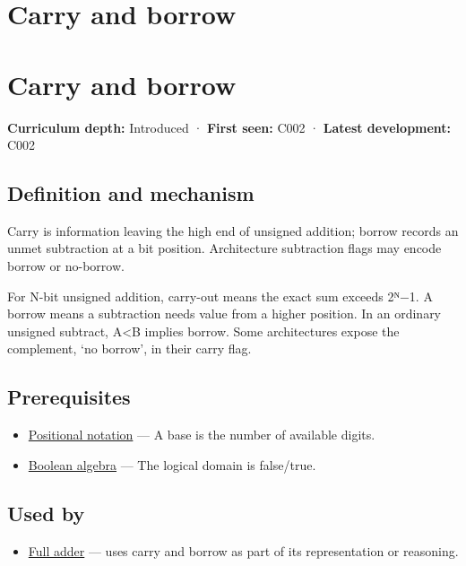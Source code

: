 \hypertarget{appendix-d52d5f78ffd1}{}
\section*{Carry and borrow}
\section{Carry and borrow}\label{appendix-d52d5f78ffd1-carry-and-borrow}

\textbf{Curriculum depth:} Introduced · \textbf{First seen:} C002 · \textbf{Latest development:} C002

\subsection{Definition and mechanism}\label{appendix-d52d5f78ffd1-definition-and-mechanism}

Carry is information leaving the high end of unsigned addition; borrow records an unmet subtraction at a bit position. Architecture subtraction flags may encode borrow or no-borrow.

For N-bit unsigned addition, carry-out means the exact sum exceeds 2ᴺ−1. A borrow means a subtraction needs value from a higher position. In an ordinary unsigned subtract, A\textless B implies borrow. Some architectures expose the complement, `no borrow', in their carry flag.

\subsection{Prerequisites}\label{appendix-d52d5f78ffd1-prerequisites}

\begin{itemize}
\tightlist
\item
  \hyperref[appendix-83c3f28f7bda]{Positional notation} --- A base is the number of available digits.
\item
  \hyperref[appendix-24475e1596a8]{Boolean algebra} --- The logical domain is false/true.
\end{itemize}

\subsection{Used by}\label{appendix-d52d5f78ffd1-used-by}

\begin{itemize}
\tightlist
\item
  \hyperref[appendix-d1a5b1e520c2]{Full adder} --- uses carry and borrow as part of its representation or reasoning.
\end{itemize}

